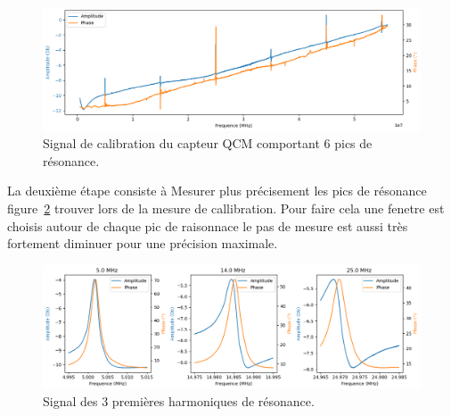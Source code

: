 \begin{figure}[H]
    \centering
    \includegraphics[width=\textwidth]{assets/figures/Calibration.png}
    \caption{Signal de calibration du capteur QCM comportant 6 pics de résonance.}
    \label{fig:calibration plot}
\end{figure}
La deuxième étape consiste à Mesurer plus précisement les pics de résonance figure~\ref{fig:harmonic plot} trouver lors de la mesure de callibration. Pour faire cela une fenetre est choisis autour de chaque pic de raisonnace le pas de mesure est aussi très fortement diminuer pour une précision maximale.
\begin{figure}[H]
    \centering
    \includegraphics[width=\textwidth]{assets/figures/signalpeak.png}
    \caption{Signal des 3 premières harmoniques de résonance.}
    \label{fig:harmonic plot}
\end{figure}

